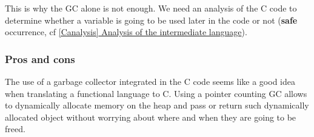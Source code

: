 \documentclass[12pt,a4paper]{article}
\newcommand{\safe}{\textbf{safe }}
\begin{document}
This is why the GC alone is not enough. We need an analysis of the C code to determine whether a variable is going to be used later in the code or not (\safe occurrence, cf \hyperref[Canalysis]{\ref*{Canalysis} Analysis of the intermediate language}).


\subsubsection{Pros and cons}

The use of a garbage collector integrated in the C code seems like a good idea when translating a functional language to C. Using a pointer counting GC allows to dynamically allocate memory on the heap and pass or return such dynamically allocated object without worrying about where and when they are going to be freed.\\
\end{document}
